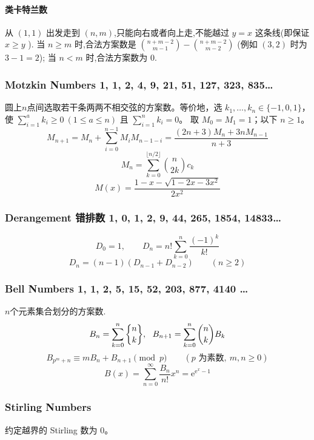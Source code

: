 \begin{footnotesize}
\paragraph*{类卡特兰数}
从 $(1,1)$ 出发走到 $(n,m)$,只能向右或者向上走,不能越过 $y=x$ 这条线(即保证 $x\geq y$ ). 当 $n\geq m$ 时,合法方案数是 $\binom{n+m-2}{m-1}-\binom{n+m-2}{m-2}$ (例如 $(3,2)$ 时为 $3-1=2$); 当 $n<m$ 时,合法方案数为 $0$.
\subsubsection{Motzkin Numbers 1, 1, 2, 4, 9, 21, 51, 127, 323, 835\dots}
圆上$n$点间选取若干条两两不相交弦的方案数。等价地，选
$k_1,\ldots,k_n\in\{-1,0,1\}$，使
$\sum_{i=1}^{a}k_i\ge0\ (1\le a\le n)$ 且 $\sum_{i=1}^{n}k_i=0$。
取 $M_0=M_1=1$；以下 $n\ge1$。
\[M_{n+1}=M_n+\sum_{i=0}^{n-1}M_iM_{n-1-i}=\frac{(2n+3)M_n+3nM_{n-1}}{n+3}\]
\[M_n=\sum_{k=0}^{\lfloor n/2\rfloor}\binom{n}{2k}c_k\]
\[M(x)=\frac{1-x-\sqrt{1-2x-3x^2}}{2x^2}\]
\subsubsection{Derangement 错排数 1, 0, 1, 2, 9, 44, 265, 1854, 14833\dots}
\[D_0=1,\qquad D_n=n!\sum_{k=0}^{n}\frac{(-1)^k}{k!}\]
\[D_n=(n-1)(D_{n-1}+D_{n-2})\qquad(n\ge2)\]
\subsubsection{Bell Numbers 1, 1, 2, 5, 15, 52, 203, 877, 4140 \dots}
$n$个元素集合划分的方案数.
\[ B_n=\sum_{k=0}^{n}\stirlingtwo{n}{k},\ \ B_{n+1} = \sum_{k=0}^n\binom{n}{k}B_k \]
\[ B_{p^m+n} \equiv mB_n+B_{n+1} \pmod{p}
\qquad(p\text{ 为素数},\ m,n\ge0) \]
\[B(x)=\sum_{n=0}^{\infty}\frac{B_n}{n!}x^n=\mathrm{e}^{\mathrm{e}^x-1}\]
\subsubsection{Stirling Numbers}
约定越界的 Stirling 数为 $0$。

\end{footnotesize}
